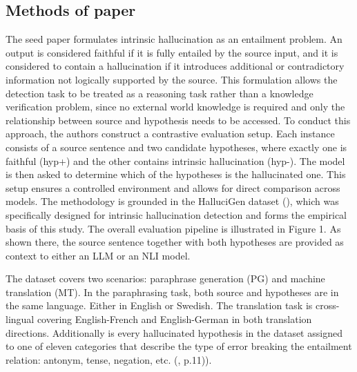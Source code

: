 \documentclass[
  seminar,   	 
  english,   	 
  titlepage=on,
  captions=tableheadings
]{ttlab-qualify}
\begin{document}
\subsection{Methods of paper}
The seed paper formulates intrinsic hallucination as an entailment problem. An output is considered faithful if it is fully entailed by the source input, and it is considered to contain a hallucination if it introduces additional or contradictory information not logically supported by the source. This formulation allows the detection task to be treated as a reasoning task rather than a knowledge verification problem, since no external world knowledge is required and only the relationship between source and hypothesis needs to be accessed.
To conduct this approach, the authors construct a contrastive evaluation setup. Each instance consists of a source sentence and two candidate hypotheses, where exactly one is faithful (hyp+) and the other contains intrinsic hallucination (hyp-). The model is then asked to determine which of the hypotheses is the hallucinated one. This setup ensures a controlled environment and allows for direct comparison across models. The methodology is grounded in the HalluciGen dataset (\cite{durlich2024hallucigen}), which was specifically designed for intrinsic hallucination detection and forms the empirical basis of this study.
The overall evaluation pipeline is illustrated in Figure 1. As shown there, the source sentence together with both hypotheses are provided as context to either an LLM or an NLI model.

The dataset covers two scenarios: paraphrase generation (PG) and machine translation (MT). In the paraphrasing task, both source and hypotheses are in the same language.  Either in English or Swedish. The translation task is cross-lingual covering English-French and English-German in both translation directions. Additionally is every hallucinated hypothesis in the dataset assigned to one of eleven categories that describe the type of error breaking the entailment relation: antonym, tense, negation, etc. (\cite{Gogoulou2025LLMHallucinationDetection}, p.11)).
\end{document}
